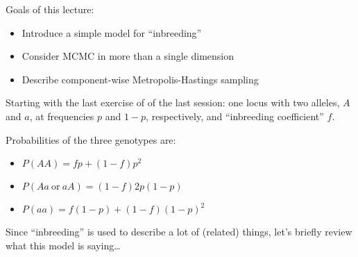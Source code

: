 








Goals of this lecture:
\begin{itemize}
\item Introduce a simple model for ``inbreeding''
\item Consider MCMC in more than a single dimension
\item Describe component-wise Metropolis-Hastings sampling 
\end{itemize}

Starting with the last exercise of of the last session: one locus with two alleles, $A$ and $a$, at frequencies $p$ and $1-p$, respectively, and ``inbreeding coefficient'' $f$.

Probabilities of the three genotypes are:
\begin{itemize}
\item $P(AA) = fp + (1-f)p^2$
\item $P(Aa~\mathrm{or}~aA) = (1-f)2p(1-p)$
\item $P(aa) = f(1-p) + (1-f)(1-p)^2$
\end{itemize}

Since ``inbreeding'' is used to describe a lot of (related) things, let's briefly review what this model is saying\ldots




